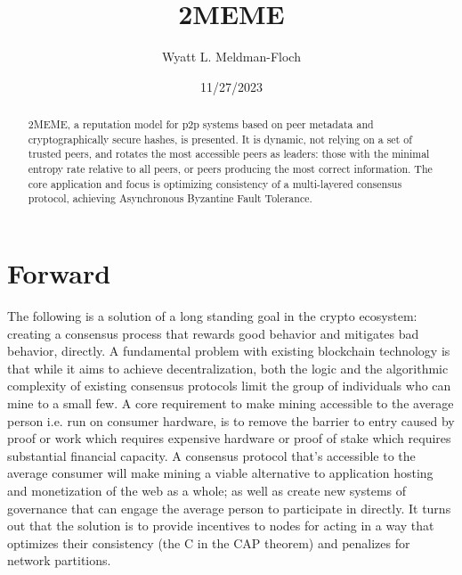 \documentclass{article}
\title{2MEME}
\author{Wyatt L. Meldman-Floch}
\date{11/27/2023}
\theoremstyle{definition}
\theoremstyle{remark}
\theoremstyle{plain}
\begin{document}
\maketitle

\begin{abstract}
2MEME, a reputation model for p2p systems based on peer metadata and cryptographically secure hashes, is presented. It is dynamic, not relying on a set of trusted peers, and rotates the most accessible peers as leaders: those with the minimal entropy rate relative to all peers, or peers producing the most correct information. The core application and focus is optimizing consistency of a multi-layered consensus protocol, achieving Asynchronous Byzantine Fault Tolerance.

\end{abstract}

\tableofcontents

\setcounter{secnumdepth}{0}

\section{Forward}
\thispagestyle{FirstPage}
The following is a solution of a long standing goal in the crypto ecosystem: creating a consensus process that rewards good behavior and mitigates bad behavior, directly. A fundamental problem with existing blockchain technology is that while it aims to achieve decentralization, both the logic and the algorithmic complexity of existing consensus protocols limit the group of individuals who can mine to a small few. A core requirement to make mining accessible to the average person i.e. run on consumer hardware, is to remove the barrier to entry caused by proof or work which requires expensive hardware or proof of stake which requires substantial financial capacity. A consensus protocol that's accessible to the average consumer will make mining a viable alternative to application hosting and monetization of the web as a whole; as well as create new systems of governance that can engage the average person to participate in directly. It turns out that the solution is to provide incentives to nodes for acting in a way that optimizes their consistency (the C in the CAP theorem) and penalizes for network partitions.
\end{document}

